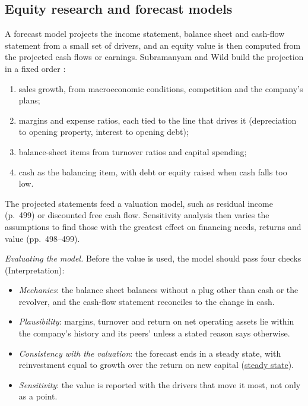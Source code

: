 \subsection{Equity research and forecast models}

\begin{qfmethod}\label{meth:forecast-model-valuation}
 A forecast model projects the income statement, balance sheet and cash-flow statement from a small set of drivers, and an equity value is then computed from the projected cash flows or earnings. Subramanyam and Wild build the projection in a fixed order \citep[pp.~492--499]{financial-statement-analysis-2009}:
\begin{enumerate}
\item sales growth, from macroeconomic conditions, competition and the company's plans;
\item margins and expense ratios, each tied to the line that drives it (depreciation to opening property, interest to opening debt);
\item balance-sheet items from turnover ratios and capital spending;
\item cash as the balancing item, with debt or equity raised when cash falls too low.
\end{enumerate}
The projected statements feed a valuation model, such as residual income (p.~499) or discounted free cash flow. Sensitivity analysis then varies the assumptions to find those with the greatest effect on financing needs, returns and value (pp.~498--499).

\emph{Evaluating the model.} Before the value is used, the model should pass four checks (Interpretation):
\begin{itemize}
\item \emph{Mechanics}: the balance sheet balances without a plug other than cash or the revolver, and the cash-flow statement reconciles to the change in cash.
\item \emph{Plausibility}: margins, turnover and return on net operating assets lie within the company's history and its peers' unless a stated reason says otherwise.
\item \emph{Consistency with the valuation}: the forecast ends in a steady state, with reinvestment equal to growth over the return on new capital (\hyperref[meth:forecast-horizon-steady-state]{steady state}).
\item \emph{Sensitivity}: the value is reported with the drivers that move it most, not only as a point.
\end{itemize}


\end{qfmethod}
